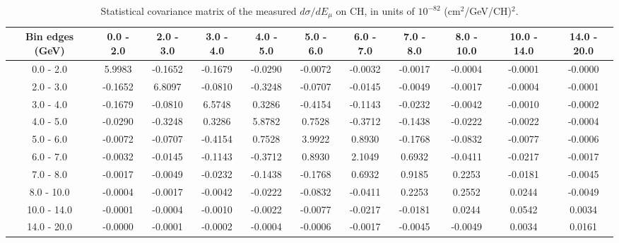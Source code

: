 \documentclass[aps,prl,twocolumn,superscriptaddress,nofootinbib]{revtex4-1}
\begin{document}
\begin{turnpage}
 \begin{table}[h!]
  \centering
  \caption{Statistical covariance matrix of the measured $d\sigma/dE_{\mu}$ on CH, in units of $10^{-82}$ (cm$^{2}$/GeV/CH)$^{2}$.}
    \begin{tabular}{c||cccccccccc}
      Bin edges (GeV) & 0.0 - 2.0 & 2.0 - 3.0 & 3.0 - 4.0 & 4.0 - 5.0 & 5.0 - 6.0 & 6.0 - 7.0 & 7.0 - 8.0 & 8.0 - 10.0 & 10.0 - 14.0 & 14.0 - 20.0 \\
\hline \hline
        0.0 - 2.0 &  5.9983 & -0.1652 & -0.1679 & -0.0290 & -0.0072 & -0.0032 & -0.0017 & -0.0004 & -0.0001 & -0.0000 \\
        2.0 - 3.0 & -0.1652 &  6.8097 & -0.0810 & -0.3248 & -0.0707 & -0.0145 & -0.0049 & -0.0017 & -0.0004 & -0.0001 \\
        3.0 - 4.0 & -0.1679 & -0.0810 &  6.5748 &  0.3286 & -0.4154 & -0.1143 & -0.0232 & -0.0042 & -0.0010 & -0.0002 \\
        4.0 - 5.0 & -0.0290 & -0.3248 &  0.3286 &  5.8782 &  0.7528 & -0.3712 & -0.1438 & -0.0222 & -0.0022 & -0.0004 \\
        5.0 - 6.0 & -0.0072 & -0.0707 & -0.4154 &  0.7528 &  3.9922 &  0.8930 & -0.1768 & -0.0832 & -0.0077 & -0.0006 \\
        6.0 - 7.0 & -0.0032 & -0.0145 & -0.1143 & -0.3712 &  0.8930 &  2.1049 &  0.6932 & -0.0411 & -0.0217 & -0.0017 \\
        7.0 - 8.0 & -0.0017 & -0.0049 & -0.0232 & -0.1438 & -0.1768 &  0.6932 &  0.9185 &  0.2253 & -0.0181 & -0.0045 \\
       8.0 - 10.0 & -0.0004 & -0.0017 & -0.0042 & -0.0222 & -0.0832 & -0.0411 &  0.2253 &  0.2552 &  0.0244 & -0.0049 \\
      10.0 - 14.0 & -0.0001 & -0.0004 & -0.0010 & -0.0022 & -0.0077 & -0.0217 & -0.0181 &  0.0244 &  0.0542 &  0.0034 \\
      14.0 - 20.0 & -0.0000 & -0.0001 & -0.0002 & -0.0004 & -0.0006 & -0.0017 & -0.0045 & -0.0049 &  0.0034 &  0.0161 \\
    \end{tabular}
  \label{tablecov:CH_Statistical_Emu}
  \end{table}
\end{turnpage}
\end{document}

